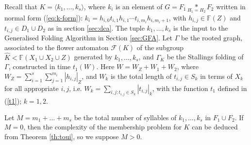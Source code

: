 \documentclass[a4paper,12pt]{article}
\newcommand{\G}{\Gamma }
\newcommand{\cF}{{\cal{F}}}
\numberwithin{equation}{section}
\numberwithin{figure}{section}
\newcommand{\FF}{\ensuremath{\mathbb{F}}}
\renewcommand{\cF}{\mathcal{F}}
\newcommand{\la}{\langle}
\newcommand{\ra}{\rangle}
\begin{document}
Recall that $K=\la k_1, \ldots , k_s\ra$, where $k_i$ is an element of $G = F_1 \underset{H_1=H_2}{\ast} F_2$
written in normal form (\ref{eq:k-form}): $k_i=
h_{i,0}t_{i,1}h_{i,1}\cdots t_{i,m_i}h_{i,m_i+1}$, with
$h_{i,j}\in \FF(Z)$ and $t_{i,j}\in D_1\cup D_2$ as in section
\ref{sec:dca}. The tuple $k_1,\ldots , k_s$ is the input to the
Generalised Folding Algorithm in Section \ref{sec:GFA}. Let $\G$ be the rooted graph, associated to
the flower automaton $\cF(K)$ of the subgroup $\hat K < \FF(X_1\cup
X_2 \cup Z)$ generated by $k_1, \ldots , k_s$, and $\G_K$ be the Stallings folding  of $\G$, constructed in time  $t_1(W)$.
Here $W = W_Z+W_1+W_2$,
 where $W_Z =
\mathop{\sum}\limits_{i=1}^{s}
\mathop{\sum}\limits_{j=1}^{m_i}|h_{i,j}|_Z$, and $W_k$ is the
total length of $t_{i,j} \in S_k$ in terms of $X_k$ for all
appropriate $i,j$, i.e. $W_k = \mathop{\sum}\limits_{i,j:
t_{i,j}\in S_k} |t_{i,j}|_k$, with the function $t_1$ defined in
(\ref{t1}); $k=1,2$.
 
Let $M = m_1+ \ldots + m_s$ be the total number of syllables of $k_1, \ldots, k_s$ in $F_1 \cup F_2$. If $M = 0$, then the complexity of the membership problem for $K$  can be deduced from Theorem \ref{th:toui}, so we suppose $M > 0$.
\end{document}
